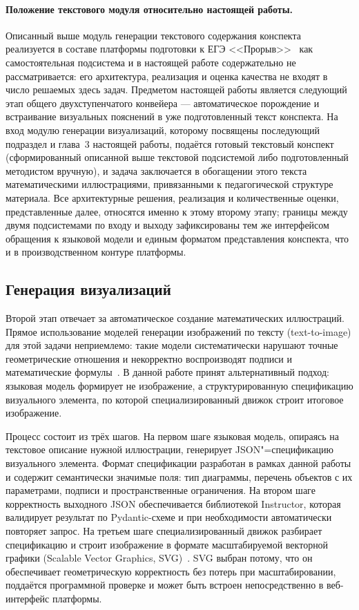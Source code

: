 \paragraph{Положение текстового модуля относительно настоящей работы.}
Описанный выше модуль генерации текстового содержания конспекта
реализуется в составе платформы подготовки к ЕГЭ <<Прорыв>>~\cite{Proriv}
как самостоятельная подсистема и в настоящей работе содержательно не
рассматривается: его архитектура, реализация и оценка качества не
входят в число решаемых здесь задач. Предметом настоящей работы является
следующий этап общего двухступенчатого конвейера --- автоматическое
порождение и встраивание визуальных пояснений в уже подготовленный
текст конспекта. На вход модулю генерации визуализаций, которому
посвящены последующий подраздел и глава~3 настоящей работы, подаётся
готовый текстовый конспект (сформированный описанной выше текстовой
подсистемой либо подготовленный методистом вручную), и задача
заключается в обогащении этого текста математическими иллюстрациями,
привязанными к педагогической структуре материала. Все архитектурные
решения, реализация и количественные оценки, представленные далее,
относятся именно к этому второму этапу; границы между двумя
подсистемами по входу и выходу зафиксированы тем же интерфейсом
обращения к языковой модели и единым форматом представления конспекта,
что и в производственном контуре платформы.

\subsection{Генерация визуализаций}

Второй этап отвечает за автоматическое создание математических иллюстраций.
Прямое использование моделей генерации изображений по тексту (text-to-image)
для этой задачи неприемлемо: такие модели систематически нарушают точные
геометрические отношения и некорректно воспроизводят подписи и математические
формулы~\cite{Bosheah2025,Wang2025MagicGeo}. В данной работе принят
альтернативный подход: языковая модель формирует не изображение, а
структурированную спецификацию визуального элемента, по которой
специализированный движок строит итоговое изображение.

Процесс состоит из трёх шагов. На первом шаге языковая модель, опираясь на
текстовое описание нужной иллюстрации, генерирует JSON"=спецификацию
визуального элемента. Формат спецификации разработан в рамках данной работы
и содержит семантически значимые поля: тип диаграммы, перечень объектов с их
параметрами, подписи и пространственные ограничения. На втором шаге
корректность выходного JSON обеспечивается библиотекой Instructor, которая
валидирует результат по Pydantic-схеме и при необходимости автоматически
повторяет запрос. На третьем шаге специализированный
движок разбирает спецификацию и строит изображение в формате масштабируемой
векторной графики (Scalable Vector Graphics, SVG)~\cite{SVG2Spec}.
SVG выбран потому, что он обеспечивает геометрическую корректность без потерь
при масштабировании, поддаётся программной проверке и может быть встроен
непосредственно в веб-интерфейс платформы.

